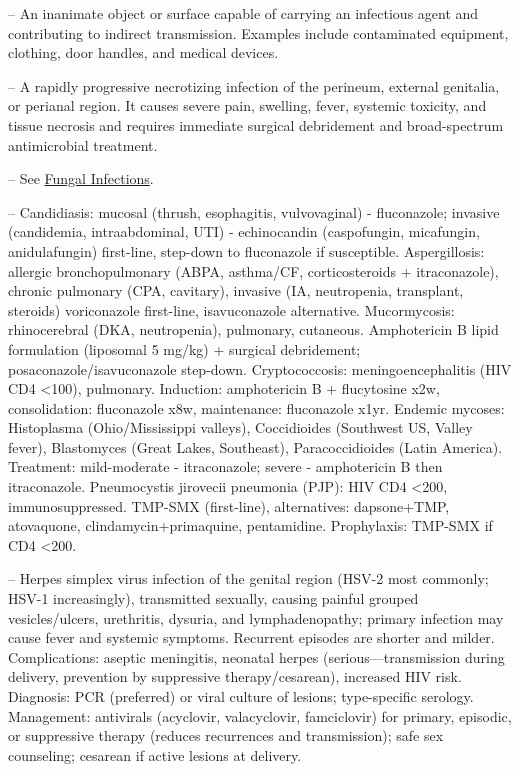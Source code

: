 -- An inanimate object or surface capable of carrying an infectious agent and contributing to indirect transmission. Examples include contaminated equipment, clothing, door handles, and medical devices.

-- A rapidly progressive necrotizing infection of the perineum, external genitalia, or perianal region. It causes severe pain, swelling, fever, systemic toxicity, and tissue necrosis and requires immediate surgical debridement and broad-spectrum antimicrobial treatment.

-- See \hyperlink{Fungal Infections}{Fungal Infections}.

-- Candidiasis: mucosal (thrush, esophagitis, vulvovaginal) - fluconazole; invasive (candidemia, intraabdominal, UTI) - echinocandin (caspofungin, micafungin, anidulafungin) first-line, step-down to fluconazole if susceptible. Aspergillosis: allergic bronchopulmonary (ABPA, asthma/CF, corticosteroids + itraconazole), chronic pulmonary (CPA, cavitary), invasive (IA, neutropenia, transplant, steroids) voriconazole first-line, isavuconazole alternative. Mucormycosis: rhinocerebral (DKA, neutropenia), pulmonary, cutaneous. Amphotericin B lipid formulation (liposomal 5 mg/kg) + surgical debridement; posaconazole/isavuconazole step-down. Cryptococcosis: meningoencephalitis (HIV CD4 <100), pulmonary. Induction: amphotericin B + flucytosine x2w, consolidation: fluconazole x8w, maintenance: fluconazole x1yr. Endemic mycoses: Histoplasma (Ohio/Mississippi valleys), Coccidioides (Southwest US, Valley fever), Blastomyces (Great Lakes, Southeast), Paracoccidioides (Latin America). Treatment: mild-moderate - itraconazole; severe - amphotericin B then itraconazole. Pneumocystis jirovecii pneumonia (PJP): HIV CD4 <200, immunosuppressed. TMP-SMX (first-line), alternatives: dapsone+TMP, atovaquone, clindamycin+primaquine, pentamidine. Prophylaxis: TMP-SMX if CD4 <200.

-- Herpes simplex virus infection of the genital region (HSV-2 most commonly; HSV-1 increasingly), transmitted sexually, causing painful grouped vesicles/ulcers, urethritis, dysuria, and lymphadenopathy; primary infection may cause fever and systemic symptoms. Recurrent episodes are shorter and milder. Complications: aseptic meningitis, neonatal herpes (serious—transmission during delivery, prevention by suppressive therapy/cesarean), increased HIV risk. Diagnosis: PCR (preferred) or viral culture of lesions; type-specific serology. Management: antivirals (acyclovir, valacyclovir, famciclovir) for primary, episodic, or suppressive therapy (reduces recurrences and transmission); safe sex counseling; cesarean if active lesions at delivery.


